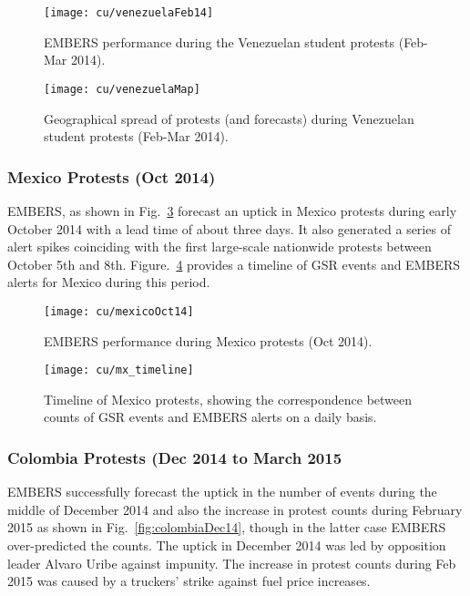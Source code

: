 \begin{figure}[H]
\centering
\texttt{[image: cu/venezuelaFeb14]}
\caption{EMBERS performance during the Venezuelan student protests (Feb-Mar 2014).}
\label{fig:venezuelaMarch14}
\end{figure}

\begin{figure}[H]
\centering
\texttt{[image: cu/venezuelaMap]}
\caption{Geographical spread of protests (and forecasts) during
Venezuelan student protests (Feb-Mar 2014).}
\label{fig:venezuelaMap}
\end{figure}

\subsubsection*{Mexico Protests (Oct 2014)}

EMBERS, as shown in Fig.~\ref{fig:mexicoOct14} forecast an uptick in Mexico
protests during early October 2014 with a lead time of about three days.
It also generated  a series of alert spikes coinciding with the first
large-scale nationwide protests between October 5th and 8th.
Figure.~\ref{fig:mexicoTimeline} provides a timeline of GSR events and
EMBERS alerts for Mexico during this period. 

\begin{figure}[H]
\centering
\texttt{[image: cu/mexicoOct14]}
\caption{EMBERS performance during Mexico protests (Oct 2014).}
\label{fig:mexicoOct14}
\end{figure}

\begin{figure}[H]
\centering
\texttt{[image: cu/mx\_timeline]}
\caption{Timeline of Mexico protests, showing the correspondence
between counts of GSR events and EMBERS alerts on a daily basis.}
\label{fig:mexicoTimeline}
\end{figure}

\subsubsection*{Colombia Protests (Dec 2014 to March 2015}

EMBERS successfully forecast the uptick in the number of events during the
middle of December 2014 and also the increase in protest counts 
during February 2015 as shown in Fig.~\ref{fig:colombiaDec14}, though in the 
latter case EMBERS over-predicted the counts. The uptick in
December 2014 was led by opposition leader Alvaro Uribe against impunity.
The increase in protest counts during Feb 2015 was 
caused by a truckers' strike against fuel price increases.

